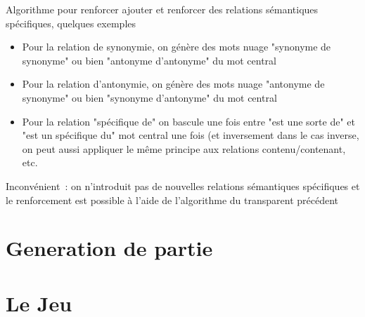 \documentclass{beamer}
\begin{document}
\begin{frame}
  Algorithme pour renforcer ajouter et renforcer des relations sémantiques spécifiques, quelques exemples
\begin{itemize}
\item Pour la relation de synonymie, on génère des mots nuage "synonyme de synonyme" ou bien "antonyme d'antonyme" du mot central
\item Pour la relation d'antonymie, on génère des mots nuage "antonyme de synonyme" ou bien "synonyme d'antonyme" du mot central
\item Pour la relation "spécifique de" on bascule une fois entre "est une sorte de" et "est un spécifique du" mot central une fois (et inversement dans le cas inverse, on peut aussi appliquer le même principe aux relations contenu/contenant, etc.
\end{itemize}
Inconvénient~: on n'introduit pas de nouvelles relations sémantiques spécifiques et le renforcement est possible à l'aide de l'algorithme du transparent précédent
\end{frame}

\section{Generation de partie}

\begin{frame}
\end{frame}

\section{Le Jeu}
\end{document}
